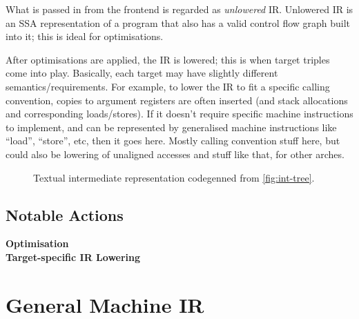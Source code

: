 \documentclass[12pt]{article}
\begin{document}
What is passed in from the frontend is regarded as \emph{unlowered} IR. Unlowered IR is an SSA representation of a program that also has a valid control flow graph built into it; this is ideal for optimisations.

After optimisations are applied, the IR is lowered; this is when target triples come into play. Basically, each target may have slightly different semantics/requirements. For example, to lower the IR to fit a specific calling convention, copies to argument registers are often inserted (and stack allocations and corresponding loads/stores). If it doesn't require specific machine instructions to implement, and can be represented by generalised machine instructions like ``load'', ``store'', etc, then it goes here. Mostly calling convention stuff here, but could also be lowering of unaligned accesses and stuff like that, for other arches.

\begin{figure}[h]
  \centering
  \caption{Textual intermediate representation codegenned from \autoref{fig:int-tree}.}
  \label{fig:int-ir}
\end{figure}
\FloatBarrier

\subsection{Notable Actions}
\label{subsec:ir:notable-actions}

\noindent\textbf{Optimisation}\\

\noindent\textbf{Target-specific IR Lowering}\\

\section{General Machine IR}
\label{sec:general-machine-ir}
\end{document}
